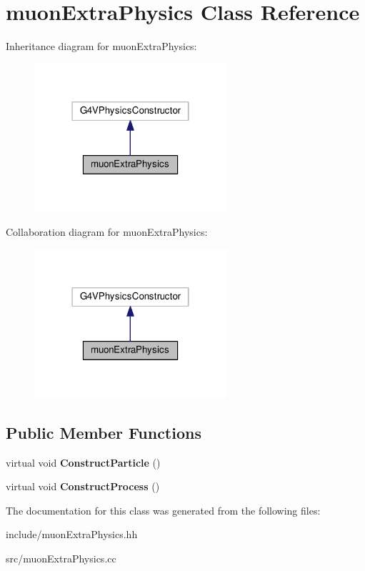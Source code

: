 \hypertarget{classmuonExtraPhysics}{}\section{muon\+Extra\+Physics Class Reference}
\label{classmuonExtraPhysics}


Inheritance diagram for muon\+Extra\+Physics\+:\nopagebreak
\begin{figure}[H]
\begin{center}
\leavevmode
\includegraphics[width=202pt]{classmuonExtraPhysics__inherit__graph}
\end{center}
\end{figure}


Collaboration diagram for muon\+Extra\+Physics\+:\nopagebreak
\begin{figure}[H]
\begin{center}
\leavevmode
\includegraphics[width=202pt]{classmuonExtraPhysics__coll__graph}
\end{center}
\end{figure}
\subsection*{Public Member Functions}
\begin{DoxyCompactItemize}
\item 
\mbox{\label{classmuonExtraPhysics_a499780469ca3774cc90f6a73bc750f1e}} 
virtual void {\bfseries Construct\+Particle} ()
\item 
\mbox{\label{classmuonExtraPhysics_acd8e6a94a2520746e6ae7cf342b83db5}} 
virtual void {\bfseries Construct\+Process} ()
\end{DoxyCompactItemize}


The documentation for this class was generated from the following files\+:\begin{DoxyCompactItemize}
\item 
include/muon\+Extra\+Physics.\+hh\item 
src/muon\+Extra\+Physics.\+cc\end{DoxyCompactItemize}

